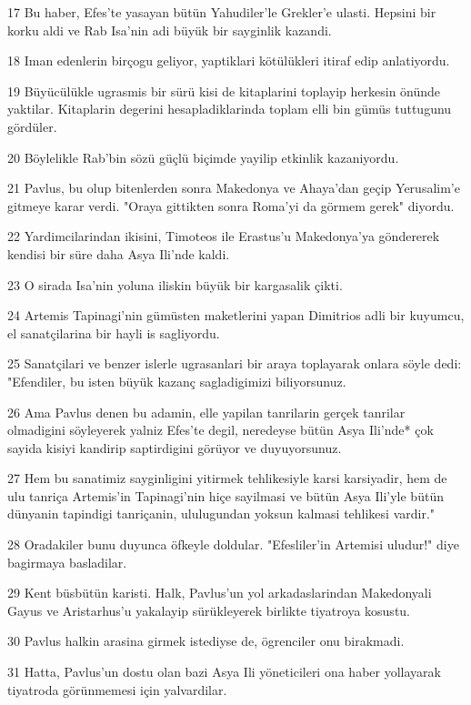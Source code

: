 \par 17 Bu haber, Efes'te yasayan bütün Yahudiler'le Grekler'e ulasti. Hepsini bir korku aldi ve Rab Isa'nin adi büyük bir sayginlik kazandi.
\par 18 Iman edenlerin birçogu geliyor, yaptiklari kötülükleri itiraf edip anlatiyordu.
\par 19 Büyücülükle ugrasmis bir sürü kisi de kitaplarini toplayip herkesin önünde yaktilar. Kitaplarin degerini hesapladiklarinda toplam elli bin gümüs tuttugunu gördüler.
\par 20 Böylelikle Rab'bin sözü güçlü biçimde yayilip etkinlik kazaniyordu.
\par 21 Pavlus, bu olup bitenlerden sonra Makedonya ve Ahaya'dan geçip Yerusalim'e gitmeye karar verdi. "Oraya gittikten sonra Roma'yi da görmem gerek" diyordu.
\par 22 Yardimcilarindan ikisini, Timoteos ile Erastus'u Makedonya'ya göndererek kendisi bir süre daha Asya Ili'nde kaldi.
\par 23 O sirada Isa'nin yoluna iliskin büyük bir kargasalik çikti.
\par 24 Artemis Tapinagi'nin gümüsten maketlerini yapan Dimitrios adli bir kuyumcu, el sanatçilarina bir hayli is sagliyordu.
\par 25 Sanatçilari ve benzer islerle ugrasanlari bir araya toplayarak onlara söyle dedi: "Efendiler, bu isten büyük kazanç sagladigimizi biliyorsunuz.
\par 26 Ama Pavlus denen bu adamin, elle yapilan tanrilarin gerçek tanrilar olmadigini söyleyerek yalniz Efes'te degil, neredeyse bütün Asya Ili'nde* çok sayida kisiyi kandirip saptirdigini görüyor ve duyuyorsunuz.
\par 27 Hem bu sanatimiz sayginligini yitirmek tehlikesiyle karsi karsiyadir, hem de ulu tanriça Artemis'in Tapinagi'nin hiçe sayilmasi ve bütün Asya Ili'yle bütün dünyanin tapindigi tanriçanin, ululugundan yoksun kalmasi tehlikesi vardir."
\par 28 Oradakiler bunu duyunca öfkeyle doldular. "Efesliler'in Artemisi uludur!" diye bagirmaya basladilar.
\par 29 Kent büsbütün karisti. Halk, Pavlus'un yol arkadaslarindan Makedonyali Gayus ve Aristarhus'u yakalayip sürükleyerek birlikte tiyatroya kosustu.
\par 30 Pavlus halkin arasina girmek istediyse de, ögrenciler onu birakmadi.
\par 31 Hatta, Pavlus'un dostu olan bazi Asya Ili yöneticileri ona haber yollayarak tiyatroda görünmemesi için yalvardilar.
